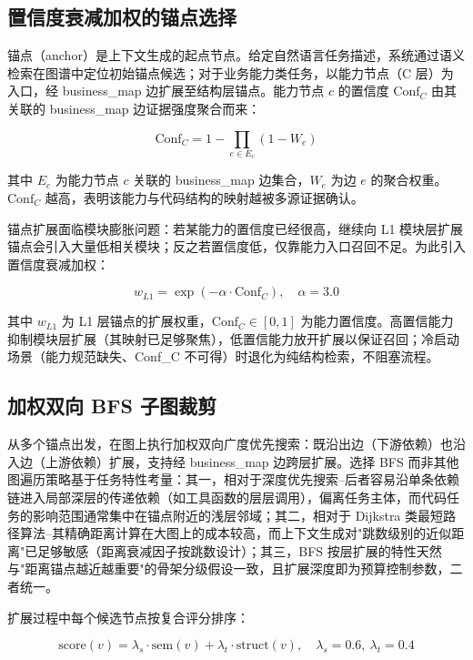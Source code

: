 \subsection{置信度衰减加权的锚点选择}
锚点（anchor）是上下文生成的起点节点。给定自然语言任务描述，系统通过语义检索在图谱中定位初始锚点候选；对于业务能力类任务，以能力节点（C 层）为入口，经 business\_map 边扩展至结构层锚点。能力节点 $c$ 的置信度 $\mathrm{Conf}_C$ 由其关联的 business\_map 边证据强度聚合而来：

\begin{equation}
\mathrm{Conf}_C = 1 - \prod_{e \in E_c}(1 - W_e) \tag{3-2}
\end{equation}

其中 $E_c$ 为能力节点 $c$ 关联的 business\_map 边集合，$W_e$ 为边 $e$ 的聚合权重。$\mathrm{Conf}_C$ 越高，表明该能力与代码结构的映射越被多源证据确认。

锚点扩展面临模块膨胀问题：若某能力的置信度已经很高，继续向 L1 模块层扩展锚点会引入大量低相关模块；反之若置信度低，仅靠能力入口召回不足。为此引入置信度衰减加权：

\begin{equation}
w_{L1} = \exp(-\alpha \cdot \mathrm{Conf}_C), \quad \alpha = 3.0 \tag{3-3}
\end{equation}

其中 $w_{L1}$ 为 L1 层锚点的扩展权重，$\mathrm{Conf}_C \in [0,1]$ 为能力置信度。高置信能力抑制模块层扩展（其映射已足够聚焦），低置信能力放开扩展以保证召回；冷启动场景（能力规范缺失、Conf\_C 不可得）时退化为纯结构检索，不阻塞流程。


\subsection{加权双向 BFS 子图裁剪}
从多个锚点出发，在图上执行加权双向广度优先搜索：既沿出边（下游依赖）也沿入边（上游依赖）扩展，支持经 business\_map 边跨层扩展。选择 BFS 而非其他图遍历策略基于任务特性考量：其一，相对于深度优先搜索--后者容易沿单条依赖链进入局部深层的传递依赖（如工具函数的层层调用），偏离任务主体，而代码任务的影响范围通常集中在锚点附近的浅层邻域；其二，相对于 Dijkstra 类最短路径算法--其精确距离计算在大图上的成本较高，而上下文生成对"跳数级别的近似距离"已足够敏感（距离衰减因子按跳数设计）；其三，BFS 按层扩展的特性天然与"距离锚点越近越重要"的骨架分级假设一致，且扩展深度即为预算控制参数，二者统一。

扩展过程中每个候选节点按复合评分排序：

\begin{equation}
\mathrm{score}(v) = \lambda_s \cdot \mathrm{sem}(v) + \lambda_t \cdot \mathrm{struct}(v), \quad \lambda_s = 0.6,\ \lambda_t = 0.4 \tag{3-4}
\end{equation}

